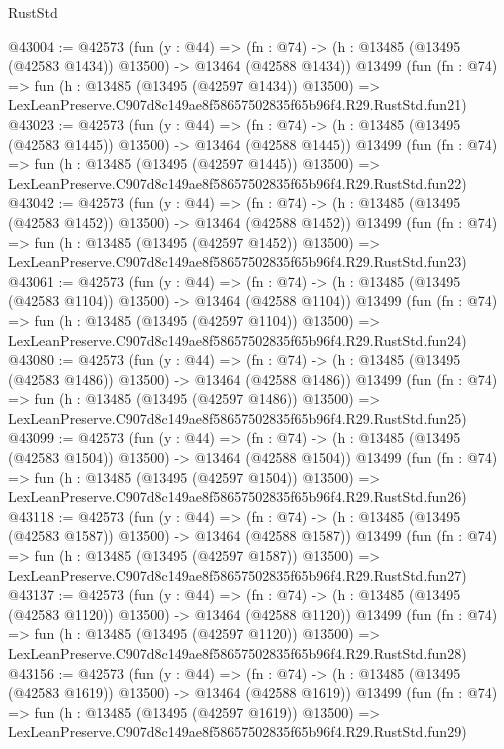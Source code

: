 \begin{lexlean}{RustStd}
\begin{coremodule}
@43004 := @42573
    (fun (y : @44) =>
    (fn : @74) -> (h : @13485 (@13495 (@42583 @1434)) @13500) -> @13464 (@42588 @1434))
    @13499
    (fun (fn : @74) =>
    fun (h : @13485 (@13495 (@42597 @1434)) @13500) =>
    LexLeanPreserve.C907d8c149ae8f58657502835f65b96f4.R29.RustStd.fun21)
@43023 := @42573
    (fun (y : @44) =>
    (fn : @74) -> (h : @13485 (@13495 (@42583 @1445)) @13500) -> @13464 (@42588 @1445))
    @13499
    (fun (fn : @74) =>
    fun (h : @13485 (@13495 (@42597 @1445)) @13500) =>
    LexLeanPreserve.C907d8c149ae8f58657502835f65b96f4.R29.RustStd.fun22)
@43042 := @42573
    (fun (y : @44) =>
    (fn : @74) -> (h : @13485 (@13495 (@42583 @1452)) @13500) -> @13464 (@42588 @1452))
    @13499
    (fun (fn : @74) =>
    fun (h : @13485 (@13495 (@42597 @1452)) @13500) =>
    LexLeanPreserve.C907d8c149ae8f58657502835f65b96f4.R29.RustStd.fun23)
@43061 := @42573
    (fun (y : @44) =>
    (fn : @74) -> (h : @13485 (@13495 (@42583 @1104)) @13500) -> @13464 (@42588 @1104))
    @13499
    (fun (fn : @74) =>
    fun (h : @13485 (@13495 (@42597 @1104)) @13500) =>
    LexLeanPreserve.C907d8c149ae8f58657502835f65b96f4.R29.RustStd.fun24)
@43080 := @42573
    (fun (y : @44) =>
    (fn : @74) -> (h : @13485 (@13495 (@42583 @1486)) @13500) -> @13464 (@42588 @1486))
    @13499
    (fun (fn : @74) =>
    fun (h : @13485 (@13495 (@42597 @1486)) @13500) =>
    LexLeanPreserve.C907d8c149ae8f58657502835f65b96f4.R29.RustStd.fun25)
@43099 := @42573
    (fun (y : @44) =>
    (fn : @74) -> (h : @13485 (@13495 (@42583 @1504)) @13500) -> @13464 (@42588 @1504))
    @13499
    (fun (fn : @74) =>
    fun (h : @13485 (@13495 (@42597 @1504)) @13500) =>
    LexLeanPreserve.C907d8c149ae8f58657502835f65b96f4.R29.RustStd.fun26)
@43118 := @42573
    (fun (y : @44) =>
    (fn : @74) -> (h : @13485 (@13495 (@42583 @1587)) @13500) -> @13464 (@42588 @1587))
    @13499
    (fun (fn : @74) =>
    fun (h : @13485 (@13495 (@42597 @1587)) @13500) =>
    LexLeanPreserve.C907d8c149ae8f58657502835f65b96f4.R29.RustStd.fun27)
@43137 := @42573
    (fun (y : @44) =>
    (fn : @74) -> (h : @13485 (@13495 (@42583 @1120)) @13500) -> @13464 (@42588 @1120))
    @13499
    (fun (fn : @74) =>
    fun (h : @13485 (@13495 (@42597 @1120)) @13500) =>
    LexLeanPreserve.C907d8c149ae8f58657502835f65b96f4.R29.RustStd.fun28)
@43156 := @42573
    (fun (y : @44) =>
    (fn : @74) -> (h : @13485 (@13495 (@42583 @1619)) @13500) -> @13464 (@42588 @1619))
    @13499
    (fun (fn : @74) =>
    fun (h : @13485 (@13495 (@42597 @1619)) @13500) =>
    LexLeanPreserve.C907d8c149ae8f58657502835f65b96f4.R29.RustStd.fun29)

\end{coremodule}
\end{lexlean}
